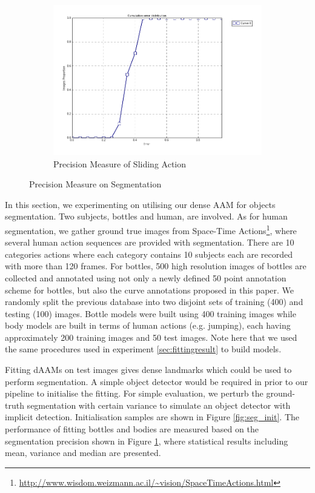 \begin{figure}[h!]
\begin{subfigure}[b]{0.1\textwidth}
            \includegraphics[width=\textwidth]{supports/Segmentation_Measure/body_slide_seg}
        \caption{Precision Measure of Sliding Action}
    \end{subfigure}
    \caption{Precision Measure on Segmentation}
    \label{fig:seg_result}
\end{figure}

In this section, we experimenting on utilising our dense AAM for objects segmentation. Two subjects, bottles and human, are involved. As for human segmentation, we gather ground true images from Space-Time Actions\footnote{\label{sta} \url{http://www.wisdom.weizmann.ac.il/~vision/SpaceTimeActions.html}}\cite{ActionsAsSpaceTimeShapes_iccv05]}, where several human action sequences are provided with segmentation. There are 10 categories actions where each category contains 10 subjects each are recorded with more than 120 frames. For bottles, 500 high resolution images of bottles are collected and annotated using not only a newly defined 50 point annotation scheme for bottles, but also the curve annotations proposed in this paper. We randomly split the previous database into two disjoint sets of training (400) and testing (100) images. Bottle models were built using 400 training images while body models are built in terms of human actions (e.g. jumping), each having approximately 200 training images and 50 test images. Note here that we used the same procedures used in experiment \ref{sec:fittingresult} to build models. 

Fitting dAAMs on test images gives dense landmarks which could be used to perform segmentation. A simple object detector would be required in prior to our pipeline to initialise the fitting. For simple evaluation, we perturb the ground-truth segmentation with certain variance to simulate an object detector with implicit detection. Initialisation samples are shown in Figure \ref{fig:seg_init}. The performance of fitting bottles and bodies are measured based on the segmentation precision shown in Figure \ref{fig:seg_result}, where statistical results including mean, variance and median are presented.
    
{\small


}


